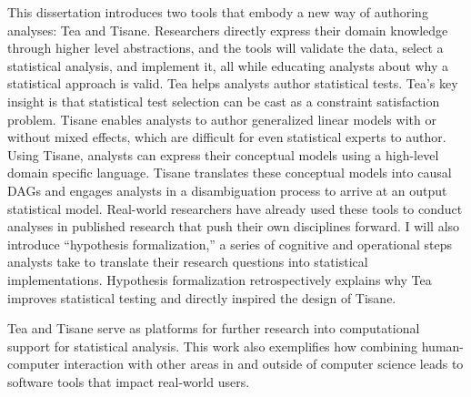 This dissertation introduces two tools that embody a new way of authoring
analyses: Tea and Tisane. Researchers directly express their domain knowledge
through higher level abstractions, and the tools will validate the data, select
a statistical analysis, and implement it, all while educating analysts about why
a statistical approach is valid. Tea helps analysts author statistical tests.
Tea's key insight is that statistical test selection can be cast as a constraint
satisfaction problem. Tisane enables analysts to author generalized linear
models with or without mixed effects, which are difficult for even statistical
experts to author. Using Tisane, analysts can express their conceptual models
using a high-level domain specific language. Tisane translates these conceptual
models into causal DAGs and engages analysts in a disambiguation process to
arrive at an output statistical model. Real-world researchers have already used
these tools to conduct analyses in published research that push their own
disciplines forward. I will also introduce ``hypothesis formalization,'' a series
of cognitive and operational steps analysts take to translate their research
questions into statistical implementations. Hypothesis formalization
retrospectively explains why Tea improves statistical testing and directly
inspired the design of Tisane. 

Tea and Tisane serve as platforms for further research into computational
support for statistical analysis. This work also exemplifies how combining
human-computer interaction with other areas in and outside of computer science
leads to software tools that impact real-world users.
